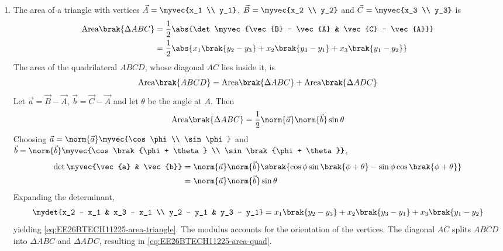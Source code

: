 \begin{enumerate}[label=\thesubsection.\arabic*, ref=\thesubsection.\theenumi]
\item The area of a triangle with vertices $\vec{A} = \myvec{x_1 \\ y_1}$, $\vec{B} = \myvec{x_2 \\ y_2}$ and $\vec{C} = \myvec{x_3 \\ y_3}$ is
\begin{align}
	\text{Area}\brak{\Delta ABC}
	&= \frac{1}{2}\abs{\det\myvec{\vec{B} - \vec{A} & \vec{C} - \vec{A}}}
	\nonumber
	\\
	&= \frac{1}{2}\abs{x_1\brak{y_2 - y_3} + x_2\brak{y_3 - y_1} + x_3\brak{y_1 - y_2}}
	\label{eq:EE26BTECH11225-area-triangle}
\end{align}
The area of the quadrilateral $ABCD$, whose diagonal $AC$ lies inside it, is
\begin{align}
	\text{Area}\brak{ABCD} = \text{Area}\brak{\Delta ABC} + \text{Area}\brak{\Delta ADC}
	\label{eq:EE26BTECH11225-area-quad}
\end{align}
\solution
Let $\vec{a} = \vec{B} - \vec{A}$, $\vec{b} = \vec{C} - \vec{A}$ and let $\theta$ be the angle at $A$. Then
\begin{align}
	\text{Area}\brak{\Delta ABC} = \frac{1}{2}\norm{\vec{a}}\norm{\vec{b}}\sin\theta
\end{align}
Choosing $\vec{a} = \norm{\vec{a}}\myvec{\cos\phi \\ \sin\phi}$ and $\vec{b} = \norm{\vec{b}}\myvec{\cos\brak{\phi + \theta} \\ \sin\brak{\phi + \theta}}$,
\begin{align}
	\det\myvec{\vec{a} & \vec{b}}
	&= \norm{\vec{a}}\norm{\vec{b}}\sbrak{\cos\phi\sin\brak{\phi + \theta} - \sin\phi\cos\brak{\phi + \theta}}
	\\
	&= \norm{\vec{a}}\norm{\vec{b}}\sin\theta
\end{align}
Expanding the determinant,
\begin{align}
	\mydet{x_2 - x_1 & x_3 - x_1 \\ y_2 - y_1 & y_3 - y_1}
	= x_1\brak{y_2 - y_3} + x_2\brak{y_3 - y_1} + x_3\brak{y_1 - y_2}
\end{align}
yielding \eqref{eq:EE26BTECH11225-area-triangle}. The modulus accounts for the orientation of the vertices. The diagonal $AC$ splits $ABCD$ into $\Delta ABC$ and $\Delta ADC$, resulting in \eqref{eq:EE26BTECH11225-area-quad}.


\end{enumerate}
